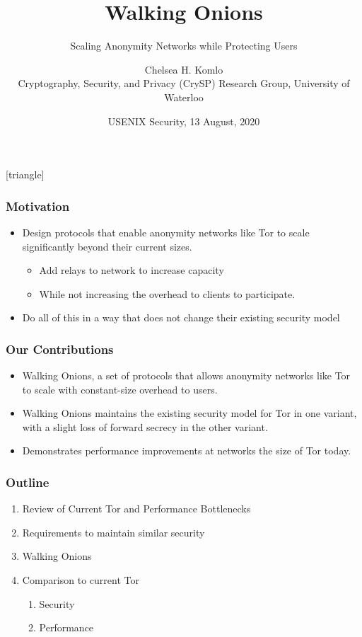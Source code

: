 \documentclass{beamer}
\title{Walking Onions}
\subtitle{Scaling Anonymity Networks while Protecting Users}
\author[Chelsea Komlo]{Chelsea H. Komlo\\{\footnotesize
Cryptography, Security, and Privacy (CrySP) Research
Group, University of Waterloo}}
\institute{\small Joint work with Nick Mathewson, Ian Goldberg}
\date{\small USENIX Security, 13 August, 2020}
\begin{document}
[triangle]

\begin{frame}
        \thispagestyle{empty}
        \maketitle
\end{frame}


\begin{frame}
\frametitle{Motivation}
  \begin{itemize}
    \item Design protocols that enable anonymity networks like Tor to scale
      significantly beyond their current sizes.
        \begin{itemize}
          \item Add relays to network to increase capacity
          \item While not increasing the overhead to clients to participate.
        \end{itemize}
    \item Do all of this in a way that does not change their existing security model
  \end{itemize}
\end{frame}

\begin{frame}
\frametitle{Our Contributions}
  \begin{itemize}
    \item Walking Onions, a set of protocols that allows anonymity networks
      like Tor to scale with constant-size overhead to users.
    \item Walking Onions maintains the existing security model for Tor in one
      variant, with a slight loss of forward secrecy in the other variant.
    \item Demonstrates performance improvements at networks the size of Tor
      today.
  \end{itemize}
\end{frame}

\begin{frame}
\frametitle{Outline}
  \begin{enumerate}
    \item Review of Current Tor and Performance Bottlenecks
    \item Requirements to maintain similar security
    \item Walking Onions
    \item Comparison to current Tor
      \begin{enumerate}
        \item Security
        \item Performance
      \end{enumerate}
  \end{enumerate}
\end{frame}
\end{document}
